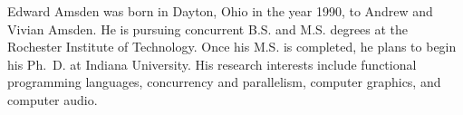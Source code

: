 \documentclass[12pt]{report}    %
\theoremstyle{definition}
\theoremstyle{remark}
\begin{document}
\begin{vita}
Edward Amsden was born in Dayton, Ohio in the year 1990, to Andrew and
Vivian Amsden. He is pursuing concurrent B.S. and M.S. degrees at the Rochester
Institute of Technology. Once his M.S. is completed, he plans to begin his
Ph.~D. at Indiana University. His research interests include functional
programming languages, concurrency and parallelism, computer graphics, and
computer audio. 
\end{vita}
\end{document}
